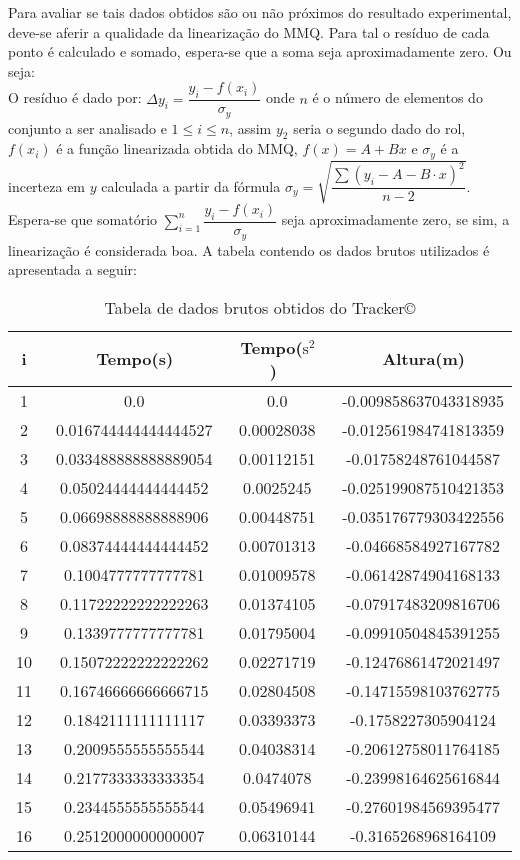 \documentclass[a4paper, 12pt]{article}
\begin{document}
		\noindent Para avaliar se tais dados obtidos são ou não próximos do resultado experimental, deve-se aferir a qualidade da linearização do MMQ. Para tal o resíduo de cada ponto é calculado e somado, espera-se que a soma seja aproximadamente zero. Ou seja: \\
			O resíduo é dado por: $\Delta y_i = \dfrac{y_i - f(x_i)}{\sigma_y}$	onde $n$ é o número de elementos do conjunto a ser analisado e $1 \le i \le n$, assim $y_2$ seria o segundo dado do rol, $f(x_i)$ é a função linearizada obtida do MMQ, $f(x)=A+Bx$ e $\sigma_y$ é a incerteza em $y$ calculada a partir da fórmula \:\: $\sigma_y = \sqrt{\dfrac{\sum{(y_i-A-B \cdot x)}^2}{n-2}}$.\\
			Espera-se que somatório $\displaystyle\sum\limits_{i=1}^n\dfrac{y_i - f(x_i)}{\sigma_y}$ seja aproximadamente zero, se sim, a linearização é considerada boa. 
			\newpage
			A tabela contendo os dados brutos utilizados é apresentada a seguir:
			\begin{table}[H]
			\centering
			\begin{tabular}{c|c|c|c}
				\hline i  & \ Tempo(s) & \ Tempo($\mathrm{s}^2$) & \ Altura(m) \\
				\hline 1 & \ 0.0 & \ 0.0  &\ -0.009858637043318935 \\
				\hline 2 & \ 0.016744444444444527 & \ 0.00028038 &\ -0.012561984741813359\\
				\hline 3 & \ 0.033488888888889054 & \ 0.00112151 &\ -0.01758248761044587\\
				\hline 4 & \ 0.05024444444444452 & \ 0.0025245 &\ -0.025199087510421353\\
				\hline 5 & \ 0.06698888888888906 & \ 0.00448751 &\ -0.035176779303422556\\
				\hline 6 & \ 0.08374444444444452 & \ 0.00701313 &\ -0.04668584927167782\\
				\hline 7 & \ 0.1004777777777781 & \ 0.01009578 &\ -0.06142874904168133\\
				\hline 8 & \ 0.11722222222222263 & \ 0.01374105 &\ -0.07917483209816706\\
				\hline 9 & \ 0.1339777777777781 & \ 0.01795004 &\ -0.09910504845391255\\
				\hline 10 & \ 0.15072222222222262 & \ 0.02271719 &\ -0.12476861472021497\\
				\hline 11 & \ 0.16746666666666715 & \ 0.02804508 &\ -0.14715598103762775\\
				\hline 12 & \ 0.1842111111111117 & \ 0.03393373 &\ -0.1758227305904124\\
				\hline 13 & \ 0.2009555555555544 & \ 0.04038314 &\ -0.20612758011764185\\
				\hline 14 & \ 0.2177333333333354 & \ 0.0474078 &\ -0.23998164625616844\\
				\hline 15 & \ 0.2344555555555544 & \ 0.05496941 &\ -0.27601984569395477\\
				\hline 16 & \ 0.2512000000000007 & \ 0.06310144 &\ -0.3165268968164109\\


				\hline
			\end{tabular}	
			\caption{Tabela de dados brutos obtidos do Tracker\copyright}
			\label{tcm}		
		\end{table}
\end{document}
